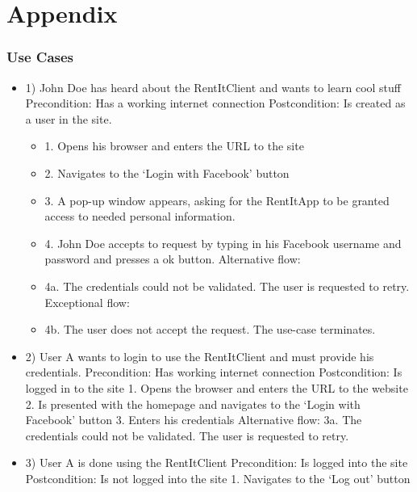 \part{Appendix}
\section{Use Cases}
\begin{itemize}

\item 1)
John Doe has heard about the RentItClient and wants to learn cool stuff
\newline Precondition: Has a working internet connection
\newline Postcondition: Is created as a user in the site. 
\begin{itemize}
    \item 1. Opens his browser and enters the URL to the site
    \item 2. Navigates to the ‘Login with Facebook’ button
	\item 3. A pop-up window appears, asking for the RentItApp to be granted access to needed personal information.
	\item 4. John Doe accepts to request by typing in his Facebook username and password and presses a ok button. 
\newline Alternative flow:
    \item 4a. The credentials could not be validated. The user is requested to retry.
\newline Exceptional flow:
    \item 4b. The user does not accept the request. The use-case terminates.
\end{itemize}

\item 2)
User A wants to login to use the RentItClient and must provide his credentials.
\newline Precondition: Has working internet connection
\newline Postcondition: Is logged in to the site
    1. Opens the browser and enters the URL to the website
    2. Is presented with the homepage and navigates to the ‘Login with Facebook’ button
    3. Enters his credentials
\newline Alternative flow:
    3a. The credentials could not be validated. The user is requested to retry.

\item 3)
User A is done using the RentItClient
\newline Precondition: Is logged into the site
\newline Postcondition: Is not logged into the site
1. Navigates to the ‘Log out’ button


\end{itemize}
